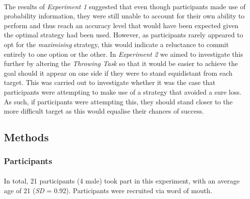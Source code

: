 \documentclass[12pt]{article}
\begin{document}
\paragraph{} The results of \textit{Experiment 1} suggested that even though participants made use of probability information, they were still unable to account for their own ability to perform and thus reach an accuracy level that would have been expected given the optimal strategy had been used. However, as participants rarely appeared to opt for the \textit{maximising} strategy, this would indicate a reluctance to commit entirely to one option or the other. In \textit{Experiment 2} we aimed to investigate this further by altering the \textit{Throwing Task} \citep{clarke2015failure} so that it would be easier to achieve the goal should it appear on one side if they were to stand equidistant from each target. This was carried out to investigate whether it was the case that participants were attempting to make use of a strategy that avoided a sure loss. As such, if participants were attempting this, they should stand closer to the more difficult target as this would equalise their chances of success. 
 
 
 
\subsection*{Methods}
\subsubsection*{Participants}
\paragraph{} In total, 21 participants (4 male) took part in this experiment, with an average age of 21 (\textit{SD} = 0.92). Participants were recruited via word of mouth.
\end{document}
